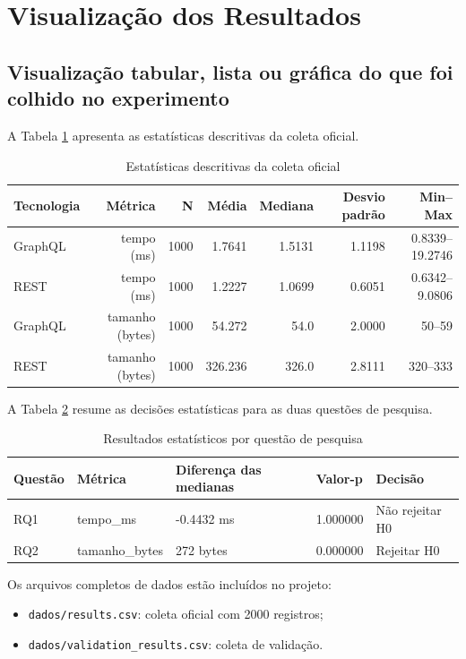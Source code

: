 \documentclass[12pt,a4paper]{article}
\begin{document}
\section{Visualização dos Resultados}

\subsection{Visualização tabular, lista ou gráfica do que foi colhido no experimento}

A Tabela \ref{tab:descritivas} apresenta as estatísticas descritivas da coleta oficial.

\begin{table}[H]
\centering
\caption{Estatísticas descritivas da coleta oficial}
\label{tab:descritivas}
\begin{tabular}{lrrrrrr}
\toprule
Tecnologia & Métrica & N & Média & Mediana & Desvio padrão & Min--Max \\
\midrule
GraphQL & tempo (ms) & 1000 & 1.7641 & 1.5131 & 1.1198 & 0.8339--19.2746 \\
REST & tempo (ms) & 1000 & 1.2227 & 1.0699 & 0.6051 & 0.6342--9.0806 \\
GraphQL & tamanho (bytes) & 1000 & 54.272 & 54.0 & 2.0000 & 50--59 \\
REST & tamanho (bytes) & 1000 & 326.236 & 326.0 & 2.8111 & 320--333 \\
\bottomrule
\end{tabular}
\end{table}

A Tabela \ref{tab:decisoes} resume as decisões estatísticas para as duas questões de pesquisa.

\begin{table}[H]
\centering
\caption{Resultados estatísticos por questão de pesquisa}
\label{tab:decisoes}
\begin{tabular}{lllll}
\toprule
Questão & Métrica & Diferença das medianas & Valor-p & Decisão \\
\midrule
RQ1 & tempo\_ms & -0.4432 ms & 1.000000 & Não rejeitar H0 \\
RQ2 & tamanho\_bytes & 272 bytes & 0.000000 & Rejeitar H0 \\
\bottomrule
\end{tabular}
\end{table}

Os arquivos completos de dados estão incluídos no projeto:

\begin{itemize}
  \item \texttt{dados/results.csv}: coleta oficial com 2000 registros;
  \item \texttt{dados/validation\_results.csv}: coleta de validação.
\end{itemize}
\end{document}
